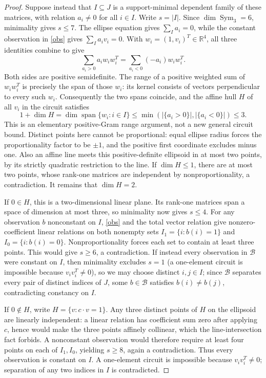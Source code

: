\documentclass[11pt]{article}
\theoremstyle{remark}\newtheorem{remark}[theorem]{Remark}
\newcommand{\R}{\mathbb R}
\numberwithin{equation}{section}
\begin{document}
\begin{proof}
Suppose instead that $I\subseteq J$ is a support-minimal dependent family
of these matrices, with relation $a_i\ne0$ for all $i\in I$.
Write $s=|I|$. Since $\dim\operatorname{Sym}_3=6$, minimality gives $s\le7$.
The ellipse equation gives $\sum_{I}a_i=0$, while the constant observation
in \eqref{obs} gives $\sum_I a_iv_i=0$.
With $w_i=(1,v_i)^T\in\R^4$, all three identities combine to give
\[
 \sum_{a_i>0}a_iw_iw_i^T=\sum_{a_i<0}(-a_i)w_iw_i^T.
\]
Both sides are positive semidefinite. The range of a positive weighted sum
of $w_iw_i^T$ is precisely the span of those $w_i$:
its kernel consists of vectors perpendicular to every such $w_i$.
Consequently the two spans coincide, and the affine hull $H$ of all $v_i$
in the circuit satisfies
\[
 1+\dim H=\dim\operatorname{span}\{w_i:i\in I\}
 \le\min(|\{a_i>0\}|,|\{a_i<0\}|)\le3.
\]
This is an elementary positive-Gram range argument, not a new general circuit bound.
Distinct points here cannot be proportional: equal ellipse radius forces
the proportionality factor to be $\pm1$, and the positive first coordinate
excludes minus one. Also an affine line meets this positive-definite ellipsoid
in at most two points, by its strictly quadratic restriction to the line.
If $\dim H\le1$, there are at most two points, whose rank-one matrices
are independent by nonproportionality, a contradiction.
It remains that $\dim H=2$.

If $0\in H$, this is a two-dimensional linear plane. Its rank-one matrices
span a space of dimension at most three, so minimality now gives $s\le4$.
For any observation $b$ nonconstant on $I$, \eqref{obs} and the total vector
relation give nonzero-coefficient linear relations on both nonempty sets
$I_1=\{i:b(i)=1\}$ and $I_0=\{i:b(i)=0\}$.
Nonproportionality forces each set to contain at least three points.
This would give $s\ge6$, a contradiction. If instead every observation in
$\mathcal B$ were constant on $I$, then minimality excludes $s=1$ (a
one-element circuit is impossible because $v_iv_i^T\ne0$), so we may choose
distinct $i,j\in I$; since $\mathcal B$ separates every pair of distinct
indices of $J$, some $b\in\mathcal B$ satisfies $b(i)\ne b(j)$,
contradicting constancy on $I$.

If $0\notin H$, write $H=\{v:c\cdot v=1\}$.
Any three distinct points of $H$ on the ellipsoid are linearly independent:
a linear relation has coefficient sum zero after applying $c$, hence would
make the three points affinely collinear, which the line-intersection fact forbids.
A nonconstant observation would therefore require at least four points
on each of $I_1,I_0$, yielding $s\ge8$, again a contradiction.
Thus every observation is constant on $I$. A one-element circuit is impossible
because $v_iv_i^T\ne0$; separation of any two indices in $I$ is contradicted.
\end{proof}
\end{document}

